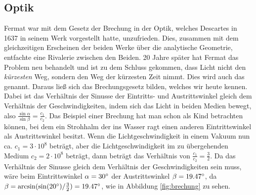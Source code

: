 \subsection{Optik} \label{sec:optik}
    Fermat war mit dem Gesetz der \Gls{Brechung} in der \Gls{Optik}, welches Descartes in 1637 in seinem Werk vorgestellt hatte, unzufrieden. Dies, zusammen mit dem gleichzeitigen Erscheinen der beiden Werke über die \gls{analytische Geometrie}, entfachte eine Rivalerie zwischen den Beiden. 20 Jahre später hat Fermat das Problem neu behandelt und ist zu dem Schluss gekommen, dass Licht nicht den \textit{kürzesten} Weg, sondern den Weg der kürzesten Zeit nimmt. Dies wird auch das  genannt. Daraus ließ sich das Brechungsgesetz bilden, welches wir heute kennen. Dabei ist das Verhältnis der Sinusse der Eintritts- und Austrittswinkel gleich dem Verhältnis der Geschwindigkeiten, indem sich das Licht in beiden Medien bewegt, also $\frac{\sin\alpha}{\sin\beta} = \frac{c_1}{c_2}$. Das Beispiel einer Brechung hat man schon als Kind betrachten können, bei dem ein Strohhalm der ins Wasser ragt einen anderen Eintrittswinkel als Austrittswinkel besitzt. Wenn die Lichtgeschwindigkeit in einem Vakuum nun ca. $c_1 = 3 \cdot 10^8$ beträgt, aber die Lichtgeschwindigkeit im zu übergehenden Medium $c_2 = 2 \cdot 10^8$ beträgt, dann beträgt das Verhältnis von $\frac{c_1}{c_2} = \frac{3}{2}$. Da das Verhältnis der Sinusse gleich dem Verhältnis der Geschwindigkeiten sein muss, wäre beim Eintrittswinkel $\alpha = 30^\circ$ der Austrittswinkel $\beta = 19.47^\circ$, da $\beta = \arcsin(\sin(20^\circ) / \frac{3}{2}) = 19.47^\circ$, wie in Abbildung \ref{fig:brechung} zu sehen.
    
